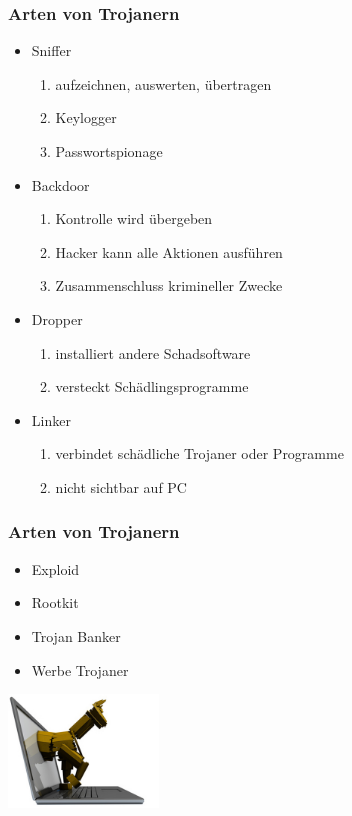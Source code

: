 \documentclass{beamer}
\begin{document}
\begin{frame}
	\frametitle{Arten von Trojanern}
	\begin{itemize}
		\item Sniffer
		\begin{enumerate}
			\item aufzeichnen, auswerten, übertragen
			\item Keylogger
			\item Passwortspionage 
		\end{enumerate}
		\item Backdoor
		\begin{enumerate}
			\item Kontrolle wird übergeben
			\item Hacker kann alle Aktionen ausführen
			\item Zusammenschluss krimineller Zwecke
		\end{enumerate}
		\item Dropper
		\begin{enumerate}
			\item installiert andere Schadsoftware
			\item versteckt Schädlingsprogramme 
		\end{enumerate}
		\item Linker
		\begin{enumerate}
			\item verbindet schädliche Trojaner oder Programme
			\item nicht sichtbar auf PC
		\end{enumerate}
	\end{itemize}
\end{frame}

\begin{frame}
	\frametitle{Arten von Trojanern}
	\begin{itemize}
		\item Exploid
		\item Rootkit
		\item Trojan Banker
		\item Werbe Trojaner
	\end{itemize}
	\flushright
	\includegraphics[width= 4cm]{bilder/trojaner.jpg}
\end{frame}
\end{document}
